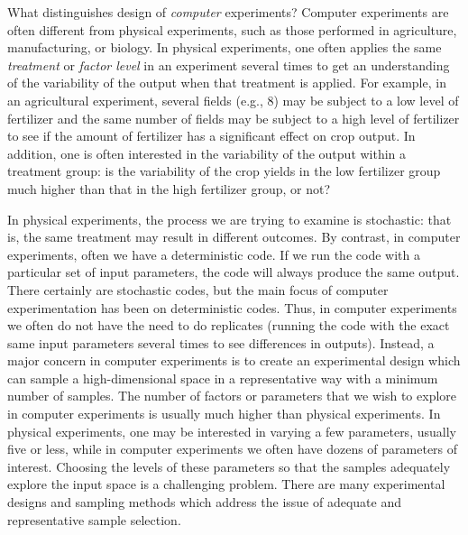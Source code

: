 What distinguishes design of {\em computer} experiments?  Computer
experiments are often different from physical experiments, such as
those performed in agriculture, manufacturing, or biology.  In
physical experiments, one often applies the same \emph{treatment} or
\emph{factor level} in an experiment several times to get an
understanding of the variability of the output when that treatment is
applied.  For example, in an agricultural experiment, several fields
(e.g., 8) may be subject to a low level of fertilizer and the same
number of fields may be subject to a high level of fertilizer to see
if the amount of fertilizer has a significant effect on crop
output. In addition, one is often interested in the variability of the
output within a treatment group: is the variability of the crop yields
in the low fertilizer group much higher than that in the high
fertilizer group, or not?

In physical experiments, the process we are trying to examine is stochastic:  
that is, the same treatment may result in different outcomes.  
By contrast, in computer experiments, often we have a deterministic code.  
If we run the code with a particular set of input parameters, the code 
will always produce the same output.  There certainly are stochastic codes, 
but the main focus of computer experimentation has been on deterministic codes. 
Thus, in computer experiments we often do not have the need to do replicates 
(running the code with the exact same input parameters several times to see 
differences in outputs).  Instead, a major concern in computer experiments is 
to create an experimental design which can sample a high-dimensional space 
in a representative way with a minimum number of samples.   
The number of factors or parameters that we wish to explore in computer 
experiments is usually much higher than physical experiments.  
In physical experiments, one may be interested in varying a few parameters, 
usually five or less, while in computer experiments we often have 
dozens of parameters of interest.  Choosing the levels of these parameters 
so that the samples adequately explore the input space is a challenging 
problem.  There are many experimental designs and sampling methods 
which address the issue of adequate and representative sample selection. 

